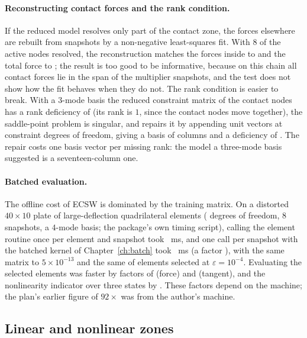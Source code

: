 \paragraph{Reconstructing contact forces and the rank condition.} If the reduced model resolves only part of the contact zone, the forces elsewhere are rebuilt from snapshots by a non-negative least-squares fit. With $8$ of the \cecNActive{} active nodes resolved, the reconstruction matches the forces inside to \cecRecIn{} and the total force to \cecRecTotal; the result is too good to be informative, because on this chain all contact forces lie in the span of the multiplier snapshots, and the test does not show how the fit behaves when they do not. The rank condition is easier to break. With a $3$-mode basis the reduced constraint matrix of the \cecNObs{} contact nodes has a rank deficiency of \cecRankDef{} (its rank is $1$, since the contact nodes move together), the saddle-point problem is singular, and  repairs it by appending \cecRankAdded{} unit vectors at constraint degrees of freedom, giving a basis of \cecRankCols{} columns and a deficiency of \cecRankAfter. The repair costs one basis vector per missing rank: the model a three-mode basis suggested is a seventeen-column one.

\paragraph{Batched evaluation.} The offline cost of ECSW is dominated by the training matrix. On a distorted $40\times10$ plate of \cbtElems{} large-deflection quadrilateral elements (\cbtDofs{} degrees of freedom, $8$ snapshots, a $4$-mode basis; the package's own timing script), calling the element routine once per element and snapshot took \cbtPer~ms, and one call per snapshot with the batched kernel of Chapter~\ref{ch:batch} took \cbtBat~ms (a factor \cbtSpeed), with the same matrix to $5\times10^{-13}$ and the same \cbtSelected{} of \cbtElems{} elements selected at $\varepsilon=10^{-4}$. Evaluating the selected elements was faster by factors of \cbtForceSpeed{} (force) and \cbtTangentSpeed{} (tangent), and the nonlinearity indicator over three states by \cbtIndSpeed. These factors depend on the machine; the plan's earlier figure of $92\times$ was from the author's machine.

\subsection{Linear and nonlinear zones}

